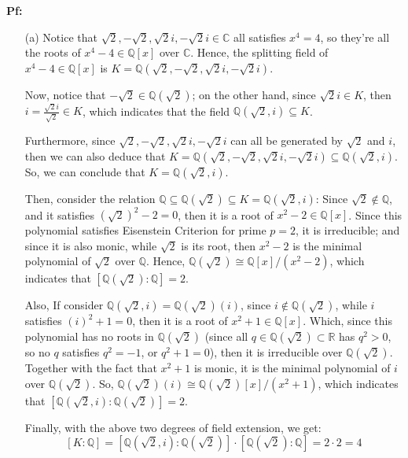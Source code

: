 \documentclass{article}
\begin{document}
\textbf{Pf:}
\begin{itemize}
    \item[(a)] Notice that $\sqrt{2},-\sqrt{2},\sqrt{2}i,-\sqrt{2}i\in\mathbb{C}$ all satisfies $x^4 = 4$, so they're all the roots of $x^4-4\in\mathbb{Q}[x]$ over $\mathbb{C}$. Hence, the splitting field of $x^4-4\in\mathbb{Q}[x]$ is $K=\mathbb{Q}(\sqrt{2},-\sqrt{2},\sqrt{2}i,-\sqrt{2}i)$.
    
    Now, notice that $-\sqrt{2}\in \mathbb{Q}(\sqrt{2})$; on the other hand, since $\sqrt{2}i\in K$, then $i=\frac{\sqrt{2}i}{\sqrt{2}} \in K$, which indicates that the field $\mathbb{Q}(\sqrt{2},i)\subseteq K$.

    Furthermore, since $\sqrt{2},-\sqrt{2},\sqrt{2}i,-\sqrt{2}i$ can all be generated by $\sqrt{2}$ and $i$, then we can also deduce that $K=\mathbb{Q}(\sqrt{2},-\sqrt{2},\sqrt{2}i,-\sqrt{2}i)\subseteq \mathbb{Q}(\sqrt{2},i)$. So, we can conclude that $K=\mathbb{Q}(\sqrt{2},i)$.

    Then, consider the relation $\mathbb{Q}\subseteq \mathbb{Q}(\sqrt{2})\subseteq K=\mathbb{Q}(\sqrt{2},i)$: Since $\sqrt{2}\notin \mathbb{Q}$, and it satisfies $(\sqrt{2})^2-2 = 0$, then it is a root of $x^2-2\in\mathbb{Q}[x]$. Since this polynomial satisfies Eisenstein Criterion for prime $p=2$, it is irreducible; and since it is also monic, while $\sqrt{2}$ is its root, then $x^2-2$ is the minimal polynomial of $\sqrt{2}$ over $\mathbb{Q}$. Hence, $\mathbb{Q}(\sqrt{2})\cong \mathbb{Q}[x]/(x^2-2)$, which indicates that $[\mathbb{Q}(\sqrt{2}):\mathbb{Q}]=2$.

    Also, If consider $\mathbb{Q}(\sqrt{2},i)=\mathbb{Q}(\sqrt{2})(i)$, since $i\notin \mathbb{Q}(\sqrt{2})$, while $i$ satisfies $(i)^2+1 = 0$, then it is a root of $x^2+1\in\mathbb{Q}[x]$. Which, since this polynomial has no roots in $\mathbb{Q}(\sqrt{2})$ (since all $q\in\mathbb{Q}(\sqrt{2})\subset\mathbb{R}$ has $q^2>0$, so no $q$ satisfies $q^2=-1$, or $q^2+1=0$), then it is irreducible over $\mathbb{Q}(\sqrt{2})$. Together with the fact that $x^2+1$ is monic, it is the minimal polynomial of $i$ over $\mathbb{Q}(\sqrt{2})$. So, $\mathbb{Q}(\sqrt{2})(i)\cong \mathbb{Q}(\sqrt{2})[x]/(x^2+1)$, which indicates that $[\mathbb{Q}(\sqrt{2},i):\mathbb{Q}(\sqrt{2})]=2$.

    Finally, with the above two degrees of field extension, we get:
    $$[K:\mathbb{Q}] = [\mathbb{Q}(\sqrt{2},i):\mathbb{Q}(\sqrt{2})]\cdot [\mathbb{Q}(\sqrt{2}):\mathbb{Q}] = 2\cdot 2 = 4$$

    \hfil


\end{itemize}
\end{document}
